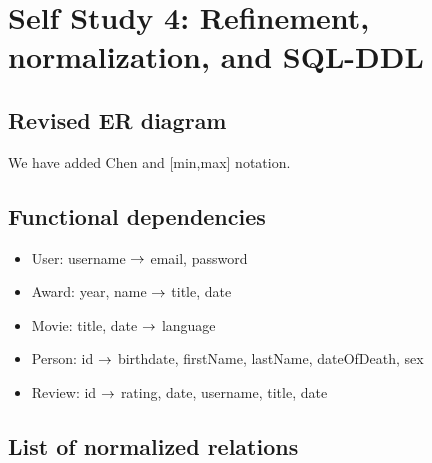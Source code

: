 \section{Self Study 4: Refinement, normalization, and SQL-DDL}

\subsection{Revised ER diagram}
We have added Chen and [min,max] notation.

\subsection{Functional dependencies}
\begin{itemize}
  \item User: username $\rightarrow$ email, password
  \item Award: year, name $\rightarrow$ title, date
  \item Movie: title, date $\rightarrow$ language
  \item Person: id $\rightarrow$ birthdate, firstName, lastName, dateOfDeath, sex
  \item Review: id $\rightarrow$ rating, date, username, title, date
\end{itemize}

\subsection{List of normalized relations}

